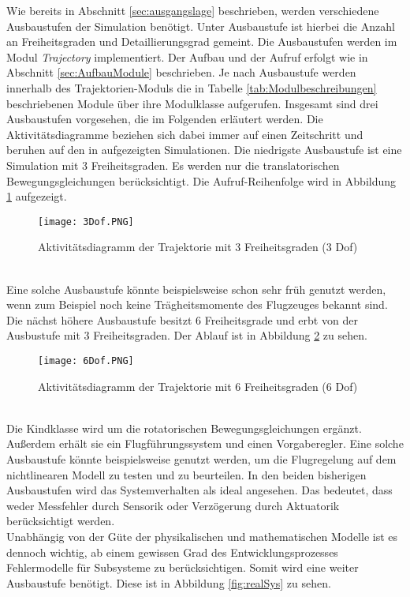 Wie bereits in Abschnitt \ref{sec:ausgangslage} beschrieben, werden verschiedene Ausbaustufen der Simulation benötigt. Unter Ausbaustufe ist hierbei die Anzahl an Freiheitsgraden und Detaillierungsgrad gemeint. Die Ausbaustufen werden im Modul \textit{Trajectory} implementiert. Der Aufbau und der Aufruf erfolgt wie in Abschnitt \ref{sec:AufbauModule} beschrieben. Je nach Ausbaustufe werden innerhalb des Trajektorien-Moduls die in Tabelle \ref{tab:Modulbeschreibungen}  beschriebenen Module über ihre Modulklasse aufgerufen.\newpage
Insgesamt sind drei Ausbaustufen vorgesehen, die im Folgenden erläutert werden. Die Aktivitätsdiagramme beziehen sich dabei immer auf einen Zeitschritt und beruhen auf den in \cite{Zipfel.2007} aufgezeigten Simulationen.
Die niedrigste Ausbaustufe ist eine Simulation mit 3 Freiheitsgraden. Es werden nur die translatorischen Bewegungsgleichungen berücksichtigt. Die Aufruf-Reihenfolge wird in Abbildung \ref{fig:3_Dof} aufgezeigt.
\begin{figure}[h]
	\centering\texttt{[image: 3Dof.PNG]}
	\caption{Aktivitätsdiagramm der Trajektorie mit 3 Freiheitsgraden (3 Dof)}
	\label{fig:3_Dof}
\end{figure}\\
Eine solche Ausbaustufe könnte beispielsweise schon sehr früh genutzt werden, wenn zum Beispiel noch keine Trägheitsmomente des Flugzeuges bekannt sind. \\
Die nächst höhere Ausbaustufe besitzt 6 Freiheitsgrade und erbt von der Ausbustufe mit 3 Freiheitsgraden. Der Ablauf ist in Abbildung \ref{fig:6Dof} zu sehen. 
\begin{figure}[h]
	\texttt{[image: 6Dof.PNG]}
	\caption{Aktivitätsdiagramm der Trajektorie mit 6 Freiheitsgraden (6 Dof)}
	\label{fig:6Dof}
\end{figure}\\
Die Kindklasse wird um die rotatorischen Bewegungsgleichungen ergänzt. Außerdem erhält sie ein Flugführungssystem und einen Vorgaberegler. Eine solche Ausbaustufe könnte beispielsweise genutzt werden, um die Flugregelung auf dem nichtlinearen Modell zu testen und zu beurteilen.  In den beiden bisherigen Ausbaustufen wird das Systemverhalten als ideal angesehen. Das bedeutet, dass weder Messfehler durch Sensorik oder Verzögerung durch Aktuatorik berücksichtigt werden. \\
Unabhängig von der Güte der physikalischen und mathematischen Modelle ist es dennoch wichtig, ab einem gewissen Grad des Entwicklungsprozesses Fehlermodelle für Subsysteme zu berücksichtigen. Somit wird eine weiter Ausbaustufe benötigt. Diese ist in Abbildung \ref{fig:realSys} zu sehen.
